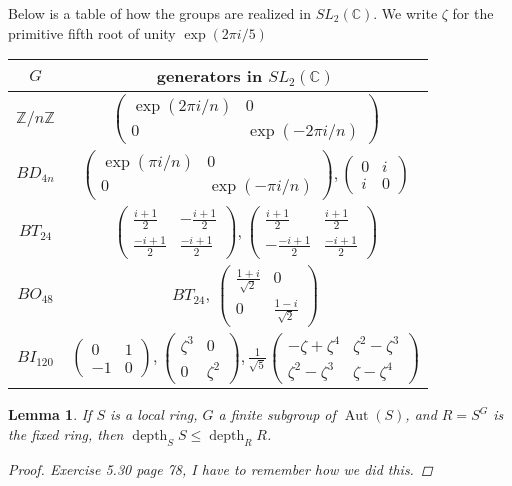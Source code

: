 \documentclass[11pt, a4paper, english]{article}
\numberwithin{prop}{section}
\newtheorem{lemma}{Lemma}
\numberwithin{lemma}{section}
\numberwithin{theorem}{section}
\numberwithin{defin}{section}
\numberwithin{example}{section}
\newcommand{\C}{\mathbb{C}}
\DeclareMathOperator{\Aut}{Aut}
\DeclareMathOperator{\depth}{depth}
\begin{document}
Below is a table of how the groups are realized in $SL_2(\C)$. We write $\zeta$ for the primitive fifth root of unity $\exp(2\pi i/5)$

{\renewcommand{\arraystretch}{2}
\begin{tabular}{|c|c|}
\hline
$G$ & generators in $SL_2(\C)$
\\
\hline
\hline
$\mathbb{Z}/n\mathbb{Z}$ & $\begin{pmatrix}
\exp(2\pi i/n) & 0\\
0 & \exp(-2\pi i/n)
\end{pmatrix} $\\
\hline
$BD_{4n}$ &  $ \begin{pmatrix}
\exp(\pi i/n) & 0\\
0 & \exp(-\pi i/n)
\end{pmatrix}, \begin{pmatrix}
0 & i\\
i & 0
\end{pmatrix} $\\
\hline
$BT_{24}$ & $ \begin{pmatrix}
\frac{i+1}{2} & -\frac{i+1}{2}\\
\frac{-i+1}{2} & \frac{-i+1}{2}
\end{pmatrix}, \begin{pmatrix}
\frac{i+1}{2} & \frac{i+1}{2}\\
-\frac{-i+1}{2} & \frac{-i+1}{2}
\end{pmatrix} $\\
\hline
$BO_{48}$ & $BT_{24}$, $\begin{pmatrix}
\frac{1+i}{\sqrt{2}} & 0\\
0 & \frac{1-i}{\sqrt{2}}
\end{pmatrix}$\\
\hline
$BI_{120}$ & $ \begin{pmatrix}
0 & 1\\
-1 & 0
\end{pmatrix}, \begin{pmatrix}
\zeta^3 & 0\\
0 & \zeta^2
\end{pmatrix}, \frac{1}{\sqrt{5}}\begin{pmatrix}
-\zeta + \zeta^4 & \zeta^2 - \zeta^3\\
\zeta^2 - \zeta^3 & \zeta - \zeta^4
\end{pmatrix}$
\\
\hline
\end{tabular}
}

\begin{lemma}
\label{lem:depth_of_S_less_than_R}
If $S$ is a local ring, $G$ a finite subgroup of $\Aut(S)$, and $R=S^G$ is the fixed ring, then $\depth_SS \leq \depth_RR$.
\begin{proof}
{\color{red} Exercise 5.30 page 78, I have to remember how we did this.}
\end{proof}
\end{lemma}
\end{document}
